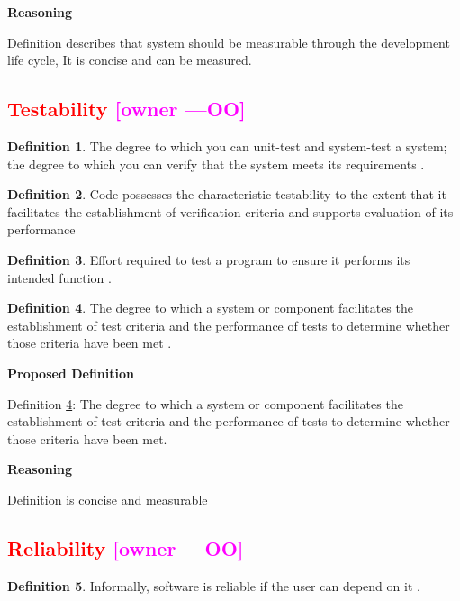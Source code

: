 \documentclass[letterpaper,cleveref]{lipics-v2019}
\newcommand{\authornote}[3]{\textcolor{#1}{[#3 ---#2]}}
\newcommand{\authornote}[3]{}
\newcommand{\oo}[1]{\authornote{magenta}{OO}{#1}} %
\newcommand{\notdone}[1]{\textcolor{red}{#1}}
\theoremstyle{definition}
\newtheorem{defn}{Definition}
\begin{document}
\noindent \textbf{Reasoning}

Definition describes that system should be measurable through the development life cycle,
It is concise and can be measured.
\subsection{\notdone{Testability} \oo{owner}}

\begin{defn}
	The degree to which you can unit-test and system-test a system;
	the degree to which you can verify that the system meets its requirements \citep{mcconnell2004code}.
\end{defn}

\begin{defn}
	Code possesses the characteristic testability to the extent that it
    facilitates the establishment of verification criteria and supports
    evaluation of its performance \citep{boehm1976quantitative}
\end{defn}

\begin{defn}
	Effort required to test a program to ensure it performs
	its intended function \citep{McCallEtAl1977}.
\end{defn}

\begin{defn} \label{Defn_Testability}
	 The degree to which a system or component facilitates the establishment of
	 test criteria and the performance of tests to determine whether those
	 criteria have been met \citep{IEEEStdGlossarySET1990}.
\end{defn}

\noindent \textbf{Proposed Definition}

Definition \ref{Defn_Testability}: The degree to which a system or component
 facilitates the establishment of test criteria and the performance of tests
 to determine whether those criteria have been met.

\noindent \textbf{Reasoning}

Definition is concise and measurable

\subsection{\notdone{Reliability} \oo{owner}}

\begin{defn}
  Informally, software is reliable if the user can depend on it \citep{GhezziEtAl2003}.
\end{defn}
\end{document}
